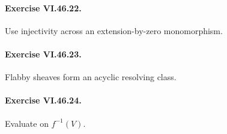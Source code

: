 \paragraph{Exercise VI.46.22.}
\begin{hint}
Use injectivity across an extension-by-zero monomorphism.
\end{hint}

\paragraph{Exercise VI.46.23.}
\begin{hint}
Flabby sheaves form an acyclic resolving class.
\end{hint}

\paragraph{Exercise VI.46.24.}
\begin{hint}
Evaluate on \(f^{-1}(V)\).
\end{hint}
